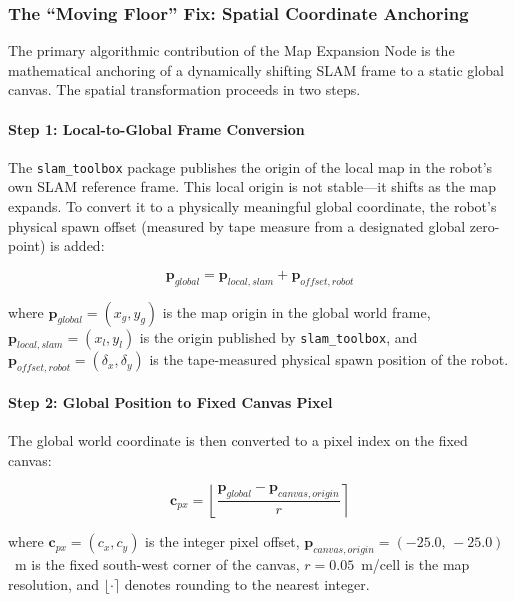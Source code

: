 \subsubsection{The ``Moving Floor'' Fix: Spatial Coordinate Anchoring}
\label{subsubsec:spatial_math}

The primary algorithmic contribution of the Map Expansion Node is the mathematical anchoring of a dynamically shifting SLAM frame to a static global canvas. The spatial transformation proceeds in two steps.

\paragraph{Step 1: Local-to-Global Frame Conversion}
The \texttt{slam\_toolbox} package publishes the origin of the local map in the robot's own SLAM reference frame. This local origin is not stable---it shifts as the map expands. To convert it to a physically meaningful global coordinate, the robot's physical spawn offset (measured by tape measure from a designated global zero-point) is added:

\begin{equation}
    \mathbf{p}_{global} = \mathbf{p}_{local,slam} + \mathbf{p}_{offset,robot}
    \label{eq:global_origin}
\end{equation}

where $\mathbf{p}_{global} = (x_{g}, y_{g})$ is the map origin in the global world frame, $\mathbf{p}_{local,slam} = (x_{l}, y_{l})$ is the origin published by \texttt{slam\_toolbox}, and $\mathbf{p}_{offset,robot} = (\delta_x, \delta_y)$ is the tape-measured physical spawn position of the robot.

\paragraph{Step 2: Global Position to Fixed Canvas Pixel}
The global world coordinate is then converted to a pixel index on the fixed canvas:

\begin{equation}
    \mathbf{c}_{px} = \left\lfloor \frac{\mathbf{p}_{global} - \mathbf{p}_{canvas,origin}}{r} \right\rceil
    \label{eq:canvas_offset}
\end{equation}

where $\mathbf{c}_{px} = (c_x, c_y)$ is the integer pixel offset, $\mathbf{p}_{canvas,origin} = (-25.0,\, -25.0)$~m is the fixed south-west corner of the canvas, $r = 0.05$~m/cell is the map resolution, and $\lfloor \cdot \rceil$ denotes rounding to the nearest integer.

